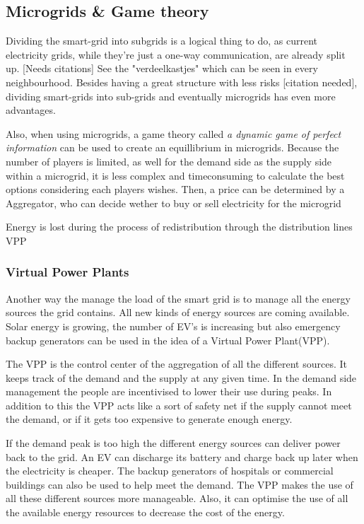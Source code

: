 \subsection{Microgrids \& Game theory}
Dividing the smart-grid into subgrids is a logical thing to do, as current electricity grids, while they're just a one-way communication, are already split up. [Needs citations] See the "verdeelkastjes" which can be seen in every neighbourhood. Besides having a great structure with less risks [citation needed], dividing smart-grids into sub-grids and eventually microgrids 
has even more advantages. 


Also, when using microgrids, a game theory called \emph{a dynamic game of perfect information} %
 can be used to create an equillibrium in microgrids. Because the number of players is limited, as well for the demand side as the supply side within a microgrid, it is less complex and timeconsuming to calculate the best options considering each players wishes. Then, a price can be determined by a Aggregator, who can decide wether to buy or sell electricity for the microgrid \cite{MicrogridModellingPetrosAristidou}


Energy is lost during the process of redistribution through the distribution lines
VPP

\subsubsection{Virtual Power Plants}
Another way the manage the load of the smart grid is to manage all the energy sources the grid contains. All new kinds of energy sources are coming available. Solar energy is growing, the number of EV's is increasing but also emergency backup generators can be used in the idea of a Virtual Power Plant(VPP). 

The VPP is the control center of the aggregation of all the different sources. It keeps track of the demand and the supply at any given time. In the demand side management the people are incentivised to lower their use during peaks. In addition to this the VPP acts like a sort of safety net if the supply cannot meet the demand, or if it gets too expensive to generate enough energy. \cite{vpprealenergy}

If the demand peak is too high the different energy sources can deliver power back to the grid. An EV can discharge its battery and charge back up later when the electricity is cheaper. The backup generators of hospitals or commercial buildings can also be used to help meet the demand. The VPP makes the use of all these different sources more manageable. Also, it can optimise the use of all the available energy resources to decrease the cost of the energy.\cite{microgridsmarketenv}